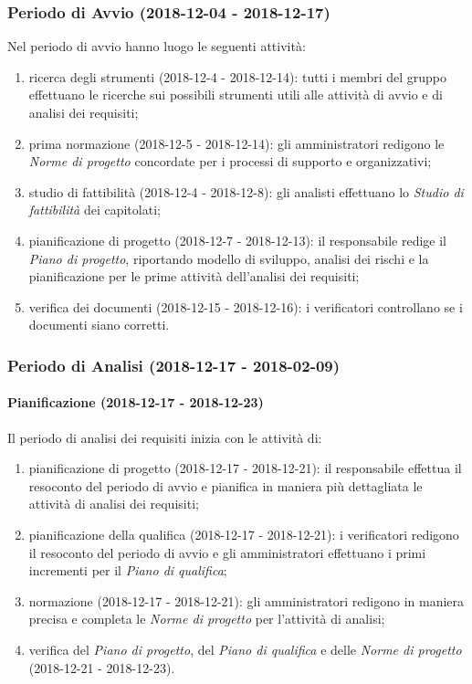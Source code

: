	\subsubsection{Periodo di Avvio (2018-12-04 - 2018-12-17)}
		Nel periodo di avvio hanno luogo le seguenti attività:
		\begin{enumerate}[label = 1.\arabic*)]
			\item ricerca degli strumenti (2018-12-4 - 2018-12-14): tutti i membri del gruppo effettuano le ricerche sui possibili strumenti utili alle attività di avvio e di analisi dei requisiti;
			\item prima normazione (2018-12-5 - 2018-12-14): gli amministratori redigono le \textit{Norme di progetto} concordate per i processi di supporto e organizzativi;
			\item studio di fattibilità (2018-12-4 - 2018-12-8): gli analisti effettuano lo \textit{Studio di fattibilità} dei capitolati;
			\item pianificazione di progetto (2018-12-7 - 2018-12-13): il responsabile redige il \textit{Piano di progetto}, riportando modello di sviluppo, analisi dei rischi e la pianificazione per le prime attività dell'analisi dei requisiti;
			\item verifica dei documenti (2018-12-15 - 2018-12-16): i verificatori controllano se i documenti siano corretti.
		\end{enumerate}
		
	\subsubsection{Periodo di Analisi (2018-12-17 - 2018-02-09)}	
		\paragraph{Pianificazione (2018-12-17 - 2018-12-23)\\} Il periodo di analisi dei requisiti inizia con le attività di:
			\begin{enumerate}[label = 2.1.\arabic*)]
				\item pianificazione di progetto (2018-12-17 - 2018-12-21): il responsabile effettua il resoconto del periodo di avvio e pianifica in maniera più dettagliata le attività di analisi dei requisiti; 
				\item pianificazione della qualifica (2018-12-17 - 2018-12-21): i verificatori redigono il resoconto del periodo di avvio e gli amministratori effettuano i primi incrementi per il \textit{Piano di qualifica};
				\item normazione (2018-12-17 - 2018-12-21): gli amministratori redigono in maniera precisa e completa le \textit{Norme di progetto} per l'attività di analisi;
				\item verifica del \textit{Piano di progetto}, del \textit{Piano di qualifica} e delle \textit{Norme di progetto} (2018-12-21 - 2018-12-23).
			\end{enumerate}
